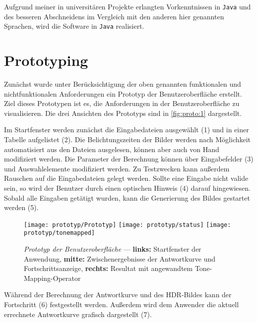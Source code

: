 Aufgrund meiner in universitären Projekte erlangten Vorkenntnissen in \texttt{Java} und des besseren Abschneidens im Vergleich mit den anderen hier genannten Sprachen, wird die Software in \texttt{Java} realisiert.


\section{Prototyping}
\label{sec:prototyp}
Zunächst wurde unter Berücksichtigung der oben genannten funktionalen und nichtfunktionalen Anforderungen ein Prototyp der Benutzeroberfläche erstellt. Ziel dieses Prototypen ist es, die Anforderungen in der Benutzeroberfläche zu visualisieren. Die drei Ansichten des Prototyps sind in \autoref{fig:proto:1} dargestellt.

Im Startfenster werden zunächst die Eingabedateien ausgewählt (1) und in einer Tabelle aufgelistet (2). Die Belichtungszeiten der Bilder werden nach Möglichkeit automatisiert aus den Dateien ausgelesen, können aber auch von Hand modifiziert werden. Die Parameter der Berechnung können über Eingabefelder (3) und Auswahlelemente modifiziert werden. Zu Testzwecken kann außerdem Rauschen auf die Eingabedateien gelegt werden. Sollte eine Eingabe nicht valide sein, so wird der Benutzer durch einen optischen Hinweis (4) darauf hingewiesen. Sobald alle Eingaben getätigt wurden, kann die Generierung des Bildes gestartet werden (5).

\begin{figure}
  \begin{center}
    \texttt{[image: prototyp/Prototyp]}
    \hspace{10pt}
	\texttt{[image: prototyp/status]}
    \hspace{10pt}
    \texttt{[image: prototyp/tonemapped]}
    \caption{\textit{Prototyp der Benutzeroberfläche} --- \textbf{links:} Startfenster der Anwendung, \textbf{mitte:} Zwischenergebnisse der Antwortkurve und Fortschrittsanzeige, \textbf{rechts:} Resultat mit angewandtem \gls{Tone-Mapping}-Operator}
    \label{fig:proto:1}
  \end{center}
\end{figure}

Während der Berechnung der Antwortkurve und des \gls{HDR}-Bildes kann der Fortschritt (6) festgestellt werden. Außerdem wird dem Anwender die aktuell errechnete Antwortkurve grafisch dargestellt (7).


